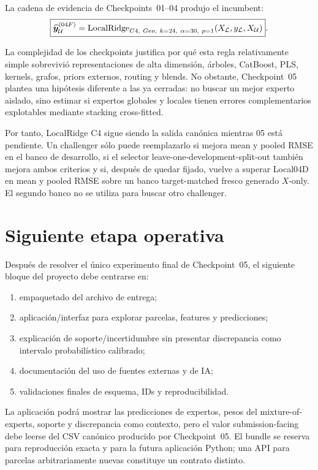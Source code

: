 La cadena de evidencia de Checkpoints~01--04 produjo el incumbent:
\[
\boxed{
\widehat{\bm y}_{\mathcal{U}}^{(04F)}
=
\operatorname{LocalRidge}_{C4,\ Geo,\ k=24,\ \alpha=30,\ p=1}
(X_{\mathcal{L}},y_{\mathcal{L}},X_{\mathcal{U}})
}.
\]

La complejidad de los checkpoints justifica por qué esta regla relativamente simple sobrevivió
representaciones de alta dimensión, árboles, CatBoost, PLS, kernels, grafos, priors externos,
routing y blends. No obstante, Checkpoint~05 plantea una hipótesis diferente a las ya cerradas:
no buscar un mejor experto aislado, sino estimar si expertos globales y locales tienen errores
complementarios explotables mediante stacking cross-fitted.

Por tanto, LocalRidge C4 sigue siendo la salida canónica mientras 05 está pendiente. Un
challenger sólo puede reemplazarlo si mejora mean y pooled RMSE en el banco de desarrollo, si
el selector leave-one-development-split-out también mejora ambos criterios y si, después de
quedar fijado, vuelve a superar Local04D en mean y pooled RMSE sobre un banco target-matched
fresco generado $X$-only. El segundo banco no se utiliza para buscar otro challenger.

\section{Siguiente etapa operativa}

Después de resolver el único experimento final de Checkpoint~05, el siguiente bloque del proyecto debe
centrarse en:
\begin{enumerate}
\item empaquetado del archivo de entrega;
\item aplicación/interfaz para explorar parcelas, features y predicciones;
\item explicación de soporte/incertidumbre sin presentar discrepancia como intervalo
probabilístico calibrado;
\item documentación del uso de fuentes externas y de IA;
\item validaciones finales de esquema, IDs y reproducibilidad.
\end{enumerate}

La aplicación podrá mostrar las predicciones de expertos, pesos del mixture-of-experts,
soporte y discrepancia como contexto, pero el valor submission-facing debe leerse del CSV
canónico producido por Checkpoint~05. El bundle
 se reserva para reproducción exacta y para
la futura aplicación Python; una API para parcelas arbitrariamente nuevas constituye un
contrato distinto.


